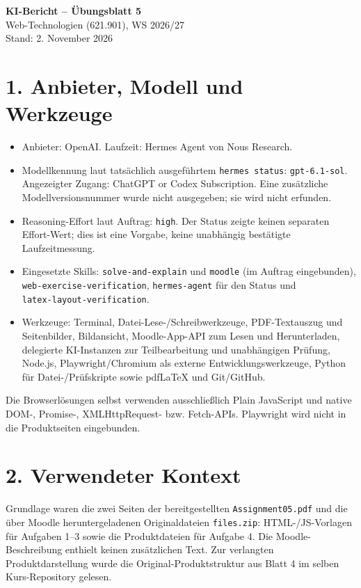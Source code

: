 \documentclass[a4paper,10pt]{article}
\begin{document}
\begin{center}
{\Large\bfseries KI-Bericht -- Übungsblatt 5}\\[4pt]
Web-Technologien (621.901), WS 2026/27\\
Stand: 2. November 2026
\end{center}

\section*{1. Anbieter, Modell und Werkzeuge}
\begin{itemize}
\item Anbieter: OpenAI. Laufzeit: Hermes Agent von Nous Research.
\item Modellkennung laut tatsächlich ausgeführtem \texttt{hermes status}: \texttt{gpt-6.1-sol}. Angezeigter Zugang: ChatGPT or Codex Subscription. Eine zusätzliche Modellversionsnummer wurde nicht ausgegeben; sie wird nicht erfunden.
\item Reasoning-Effort laut Auftrag: \texttt{high}. Der Status zeigte keinen separaten Effort-Wert; dies ist eine Vorgabe, keine unabhängig bestätigte Laufzeitmessung.
\item Eingesetzte Skills: \texttt{solve-and-explain} und \texttt{moodle} (im Auftrag eingebunden),\\
\texttt{web-exercise-verification}, \texttt{hermes-agent} für den Status und\\
\texttt{latex-layout-verification}.
\item Werkzeuge: Terminal, Datei-Lese-/Schreibwerkzeuge, PDF-Textauszug und Seitenbilder, Bildansicht, Moodle-App-API zum Lesen und Herunterladen, delegierte KI-Instanzen zur Teilbearbeitung und unabhängigen Prüfung, Node.js, Playwright/Chromium als externe Entwicklungswerkzeuge, Python für Datei-/Prüfskripte sowie pdfLaTeX und Git/GitHub.
\end{itemize}
Die Browserlösungen selbst verwenden ausschließlich Plain JavaScript und native DOM-, Promise-, XMLHttpRequest- bzw. Fetch-APIs. Playwright wird nicht in die Produktseiten eingebunden.

\section*{2. Verwendeter Kontext}
Grundlage waren die zwei Seiten der bereitgestellten \texttt{Assignment05.pdf} und die über Moodle heruntergeladenen Originaldateien \texttt{files.zip}: HTML-/JS-Vorlagen für Aufgaben 1--3 sowie die Produktdateien für Aufgabe 4. Die Moodle-Beschreibung enthielt keinen zusätzlichen Text. Zur verlangten Produktdarstellung wurde die Original-Produktstruktur aus Blatt 4 im selben Kurs-Repository gelesen.
\end{document}

